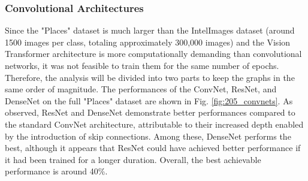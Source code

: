 \documentclass[twocolumn,superscriptaddress,aps]{revtex4-1}
\begin{document}
\subsubsection{Convolutional Architectures}

Since the "Places" dataset is much larger than the IntelImages dataset (around 1500 images per class, totaling approximately 300,000 images) and the Vision Transformer architecture is more computationally demanding than convolutional networks, it was not feasible to train them for the same number of epochs. Therefore, the analysis will be divided into two parts to keep the graphs in the same order of magnitude. The performances of the ConvNet, ResNet, and DenseNet on the full "Places" dataset are shown in Fig. \ref{fig:205_convnets}. As observed, ResNet and DenseNet demonstrate better performances compared to the standard ConvNet architecture, attributable to their increased depth enabled by the introduction of skip connections. Among these, DenseNet performs the best, although it appears that ResNet could have achieved better performance if it had been trained for a longer duration. Overall, the best achievable performance is around 40\%.\\
\end{document}
